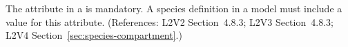 The  attribute in a \Species is mandatory.  A species
definition in a model must include a value for this attribute.  (References:
L2V2 Section~4.8.3; L2V3 Section~4.8.3; L2V4 Section~\ref{sec:species-compartment}.)
